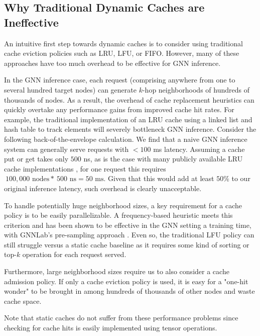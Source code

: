 \subsection{Why Traditional Dynamic Caches are Ineffective} \label{Design: strawman}
An intuitive first step towards dynamic caches is to consider using traditional cache eviction policies such as LRU, LFU, or FIFO. However, many of these approaches have too much overhead to be effective for GNN inference. 

In the GNN inference case, each request (comprising anywhere from one to several hundred target nodes) can generate $k$-hop neighborhoods of hundreds of thousands of nodes.
As a result, the overhead of cache replacement heuristics can quickly overtake any performance gains from improved cache hit rates. For example, the traditional implementation of an LRU cache using a linked list and hash table to track elements will severely bottleneck GNN inference. Consider the following back-of-the-envelope calculation. We find that a naive GNN inference system can generally serve requests with $< 100$ ms latency. Assuming a cache put or get takes only $500$ ns, as is the case with many publicly available LRU cache implementations \cite{HashiCorp_GoLang_LRU}, for one request this requires $~100,000 \text{ nodes} * ~500 \text{ ns} = 50 \text{ ms}$. Given that this would add at least $50\%$ to our original inference latency, such overhead is clearly unacceptable. 

To handle potentially huge neighborhood sizes, a key requirement for a cache policy is to be easily parallelizable. A frequency-based heuristic meets this criterion and has been shown to be effective in the GNN setting a training time, with GNNLab's pre-sampling approach \cite{GNNLab_2022}. Even so, the traditional LFU policy can still struggle versus a static cache baseline as it requires some kind of sorting or top-$k$ operation for each request served.

Furthermore, large neighborhood sizes require us to also consider a cache admission policy. If only a cache eviction policy is used, it is easy for a "one-hit wonder" to be brought in among hundreds of thousands of other nodes and waste cache space.

Note that static caches do not suffer from these performance problems since checking for cache hits is easily implemented using tensor operations.

